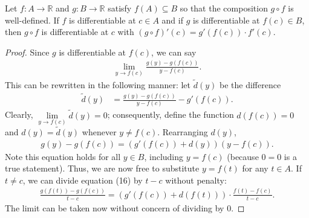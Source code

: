 \documentclass{ximera}
\begin{document}
\begin{theorem}
    Let $f :A \to \mathbb{R}$ and $g:B\to \mathbb{R}$ satisfy $f(A) \subseteq B$ so that the composition $g\circ f$ is well-defined.  If $f$ is differentiable at $c \in A$ and if $g$ is differentiable at $f(c) \in B$, then $g \circ f$ is differentiable at $c$ with $(g\circ f)'(c) = g'(f(c))\cdot f'(c)$.
\end{theorem}
\begin{proof}
    Since $g$ is differentiable at $f(c)$, we can say
    \begin{align}
        \lim\limits_{y\to f(c)} \frac{g(y) - g(f(c))}{y-f(c)}.
    \end{align}
    This can be rewritten in the following manner: let $\tilde{d}(y)$ be the difference
    \begin{align}
        \tilde{d}(y) &= \frac{g(y) - g(f(c))}{y-f(c)} - g'(f(c)).
    \end{align}
    Clearly, $\lim\limits_{y\to f(c)} \tilde{d}(y) = 0$; consequently, define the function $d(f(c)) = 0$ and $d(y) = \tilde{d}(y)$ whenever $y \neq f(c)$.  Rearranging $d(y)$, 
    \begin{align}
        g(y) - g(f(c)) = (g'(f(c)) + d(y)) (y-f(c)).
    \end{align}
    Note this equation holds for all $y \in B$, including $y = f(c)$ (because $0=0$ is a true statement).  Thus, we are now free to substitute $y = f(t)$ for any $t \in A$.  If $t \neq c$, we can divide equation (16) by $t-c$ without penalty:
    \begin{align}
        \frac{g(f(t)) - g(f(c))}{t-c} = (g'(f(c)) + d(f(t)))\cdot \frac{f(t) - f(c)}{t-c}.
    \end{align}
    The limit can be taken now without concern of dividing by $0$.
\end{proof}
\end{document}

